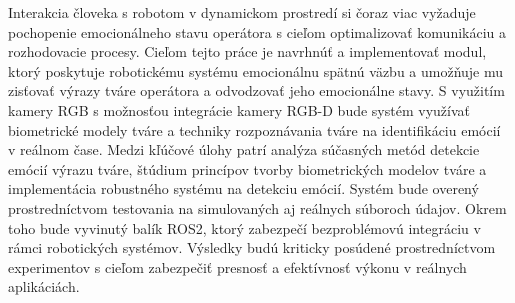Interakcia človeka s robotom v dynamickom prostredí si čoraz viac vyžaduje pochopenie emocionálneho stavu operátora s cieľom optimalizovať komunikáciu a rozhodovacie procesy. Cieľom tejto práce je navrhnúť a implementovať modul, ktorý poskytuje robotickému systému emocionálnu spätnú väzbu a umožňuje mu zisťovať výrazy tváre operátora a odvodzovať jeho emocionálne stavy. S využitím kamery RGB s možnosťou integrácie kamery RGB-D bude systém využívať biometrické modely tváre a techniky rozpoznávania tváre na identifikáciu emócií v reálnom čase. Medzi kľúčové úlohy patrí analýza súčasných metód detekcie emócií výrazu tváre, štúdium princípov tvorby biometrických modelov tváre a implementácia robustného systému na detekciu emócií. Systém bude overený prostredníctvom testovania na simulovaných aj reálnych súboroch údajov. Okrem toho bude vyvinutý balík ROS2, ktorý zabezpečí bezproblémovú integráciu v rámci robotických systémov. Výsledky budú kriticky posúdené prostredníctvom experimentov s cieľom zabezpečiť presnosť a efektívnosť výkonu v reálnych aplikáciách.

